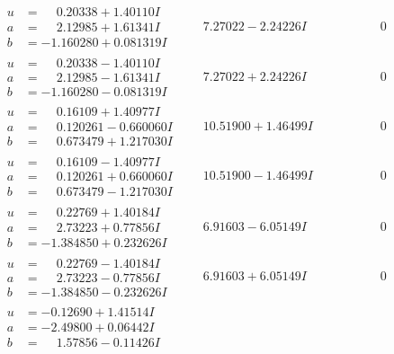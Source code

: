 \documentclass[1p]{elsarticle_modified}
\theoremstyle{definition}
\begin{document}
$$\begin{array}{c|c|c}
\begin{aligned}
u &= \phantom{-}0.20338 + 1.40110 I \\
a &= \phantom{-}2.12985 + 1.61341 I \\
b &= -1.160280 + 0.081319 I\end{aligned}
 & \phantom{-}7.27022 - 2.24226 I & \phantom{-0.000000 } 0 \\ \hline\begin{aligned}
u &= \phantom{-}0.20338 - 1.40110 I \\
a &= \phantom{-}2.12985 - 1.61341 I \\
b &= -1.160280 - 0.081319 I\end{aligned}
 & \phantom{-}7.27022 + 2.24226 I & \phantom{-0.000000 } 0 \\ \hline\begin{aligned}
u &= \phantom{-}0.16109 + 1.40977 I \\
a &= \phantom{-}0.120261 - 0.660060 I \\
b &= \phantom{-}0.673479 + 1.217030 I\end{aligned}
 & \phantom{-}10.51900 + 1.46499 I & \phantom{-0.000000 } 0 \\ \hline\begin{aligned}
u &= \phantom{-}0.16109 - 1.40977 I \\
a &= \phantom{-}0.120261 + 0.660060 I \\
b &= \phantom{-}0.673479 - 1.217030 I\end{aligned}
 & \phantom{-}10.51900 - 1.46499 I & \phantom{-0.000000 } 0 \\ \hline\begin{aligned}
u &= \phantom{-}0.22769 + 1.40184 I \\
a &= \phantom{-}2.73223 + 0.77856 I \\
b &= -1.384850 + 0.232626 I\end{aligned}
 & \phantom{-}6.91603 - 6.05149 I & \phantom{-0.000000 } 0 \\ \hline\begin{aligned}
u &= \phantom{-}0.22769 - 1.40184 I \\
a &= \phantom{-}2.73223 - 0.77856 I \\
b &= -1.384850 - 0.232626 I\end{aligned}
 & \phantom{-}6.91603 + 6.05149 I & \phantom{-0.000000 } 0 \\ \hline\begin{aligned}
u &= -0.12690 + 1.41514 I \\
a &= -2.49800 + 0.06442 I \\
b &= \phantom{-}1.57856 - 0.11426 I\end{aligned}

\end{array}$$
\end{document}
